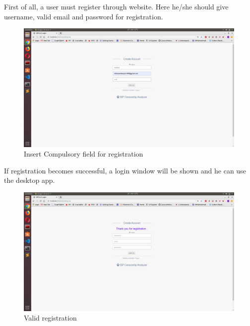 First of all, a user must register through website. Here he/she should give username, valid email and password for registration. 
\begin{figure}[h]
    \centering
    \includegraphics[width=\textwidth]{website/13registration.png}
    \caption{Insert Compulsory field for registration}
    \label{fig:web1}
\end{figure}
If registration becomes successful, a login window will be shown and he can use the desktop app.
\begin{figure}[h]
    \centering
    \includegraphics[width=\textwidth]{website/14registratin2.png}
    \caption{Valid registration}
    \label{fig:web2}
\end{figure}
